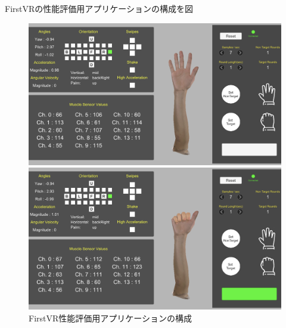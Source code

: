 \documentclass{ltjsreport}
\begin{document}
\clearpage

		FirstVRの性能評価用アプリケーションの構成を図
		\begin{figure}[H]
		\centering
		\begin{minipage}{0.75\columnwidth}
		\centering
		\includegraphics[width = \columnwidth]{../figs/IMG_1866.PNG}
		\end{minipage}
		\hspace{0.04\columnwidth}
		\begin{minipage}{0.75\columnwidth}
		\centering
		\includegraphics[width = \columnwidth]{../figs/IMG_1867.PNG}
		\end{minipage}
		\caption{FirstVR性能評価用アプリケーションの構成}
		\label{fig:FirstVRapplication}
		\end{figure}

		
\end{document}

